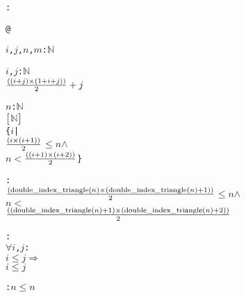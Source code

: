 \begin{alltt}
: 

   @

  \(i\), \(j\), \(n\), \(m\):  \(\mathbb{N}\)\vspace*{\pvsdeclspacing}

  \pvsid{(}\(i\), \(j\)\pvsid{)}: \(\mathbb{N}\) \pvskey{=}
      \(\opplustwofn{\opdividetwofn{\pvsid{(}\optimestwofn{\pvsid{(}\opplustwofn{i}{j}\pvsid{)}}{\pvsid{(}\opplustwofn{\opplustwofn{1}{i}}{j}\pvsid{)}}\pvsid{)}}{2}}{j}\)\vspace*{\pvsdeclspacing}

  \pvsid{(}\(n\)\pvsid{)}: \(\mathbb{N}\) \pvskey{=}
      \({\pvsbracketl}\)\(\mathbb{N}\)\({\pvsbracketr}\)
          \pvsid{(}\{\(i\) |
                \(\opdividetwofn{\pvsid{(}\optimestwofn{i}{\pvsid{(}\opplustwofn{i}{1}\pvsid{)}}\pvsid{)}}{2}\) \(\leq\) \(n\) \(\wedge\)
                 \(n\) \(<\) \(\opdividetwofn{\pvsid{(}\optimestwofn{\pvsid{(}\opplustwofn{i}{1}\pvsid{)}}{\pvsid{(}\opplustwofn{i}{2}\pvsid{)}}\pvsid{)}}{2}\)\}\pvsid{)}\vspace*{\pvsdeclspacing}

  : 
    \(\opdividetwofn{\pvsid{(}\optimestwofn{\pvsid{double\_index\_triangle}\pvsid{(}n\pvsid{)}}{\pvsid{(}\opplustwofn{\pvsid{double\_index\_triangle}\pvsid{(}n\pvsid{)}}{1}\pvsid{)}}\pvsid{)}}{2}\) \(\leq\) \(n\) \(\wedge\)
     \(n\) \(<\)
      \(\opdividetwofn{\pvsid{(}\optimestwofn{\pvsid{(}\opplustwofn{\pvsid{double\_index\_triangle}\pvsid{(}n\pvsid{)}}{1}\pvsid{)}}{\pvsid{(}\opplustwofn{\pvsid{double\_index\_triangle}\pvsid{(}n\pvsid{)}}{2}\pvsid{)}}\pvsid{)}}{2}\)\vspace*{\pvsdeclspacing}

  : 
    \(\forall\) \(i\), \(j\):
      \(i\) \(\leq\) \(j\) \(\Rightarrow\)
       \pvsid{(}\(i\)\pvsid{)} \(\leq\) \pvsid{(}\(j\)\pvsid{)}\vspace*{\pvsdeclspacing}

  :  \pvsid{(}\(n\)\pvsid{)} \(\leq\) \(n\)\vspace*{\pvsdeclspacing}


\end{alltt}
